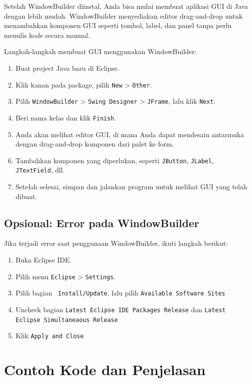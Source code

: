 Setelah WindowBuilder diinstal, Anda bisa mulai membuat aplikasi GUI di Java dengan lebih mudah. WindowBuilder menyediakan editor drag-and-drop untuk menambahkan komponen GUI seperti tombol, label, dan panel tanpa perlu menulis kode secara manual.

Langkah-langkah membuat GUI menggunakan WindowBuilder:
\begin{enumerate}
	\item Buat project Java baru di Eclipse.
	\item Klik kanan pada package, pilih \texttt{New} > \texttt{Other}.
	\item Pilih \texttt{WindowBuilder} > \texttt{Swing Designer} > \texttt{JFrame}, lalu klik \texttt{Next}.
	\item Beri nama kelas dan klik \texttt{Finish}.
	\item Anda akan melihat editor GUI, di mana Anda dapat mendesain antarmuka dengan drag-and-drop komponen dari palet ke form.
	\item Tambahkan komponen yang diperlukan, seperti \texttt{JButton}, \texttt{JLabel}, \texttt{JTextField}, dll.
	\item Setelah selesai, simpan dan jalankan program untuk melihat GUI yang telah dibuat.
\end{enumerate}



\subsection{Opsional: Error pada WindowBuilder}

Jika terjadi error saat penggunaan WindowBuilder, ikuti langkah berikut:

\begin{enumerate}
	\item Buka Eclipse IDE.
	\item Pilih menu \texttt{Eclipse} > \texttt{Settings}.
	\item Pilih bagian \texttt{ Install/Update}, lalu pilih  \texttt{Available Software Sites}
	\item Uncheck bagian \texttt{Latest Eclipse IDE Packages Release} dan  \texttt{Latest Eclipse Simultaneaous Release}
	\item Klik \texttt{Apply and Close}
\end{enumerate}

\section{Contoh Kode dan Penjelasan}


